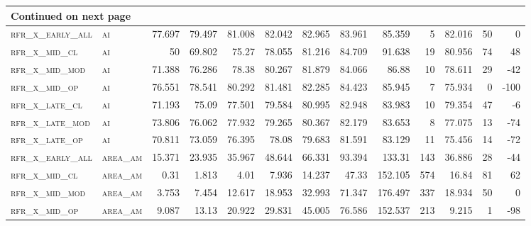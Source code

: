 \begin{landscape}
\begin{center}
\begin{footnotesize}
\begin{longtable}{llrrrrrrrr|rrr}
\hline \multicolumn{13}{|l|}{{Continued on next page}} \\ \hline
\endfoot

\hline \hline
\endlastfoot

\textsc{rfr\_x\_early\_all} & \textsc{ai        }   & 77.697  & 79.497  & 81.008  & 82.042   & 82.965   & 83.961   & 85.359   & 5      & 82.016        & 50            & 0               \\
\textsc{rfr\_x\_mid\_cl   } & \textsc{ai        }   & 50      & 69.802  & 75.27   & 78.055   & 81.216   & 84.709   & 91.638   & 19     & 80.956        & 74            & 48              \\
\textsc{rfr\_x\_mid\_mod  } & \textsc{ai        }   & 71.388  & 76.286  & 78.38   & 80.267   & 81.879   & 84.066   & 86.88    & 10     & 78.611        & 29            & -42             \\
\textsc{rfr\_x\_mid\_op   } & \textsc{ai        }   & 76.551  & 78.541  & 80.292  & 81.481   & 82.285   & 84.423   & 85.945   & 7      & 75.934        & 0             & -100            \\
\textsc{rfr\_x\_late\_cl  } & \textsc{ai        }   & 71.193  & 75.09   & 77.501  & 79.584   & 80.995   & 82.948   & 83.983   & 10     & 79.354        & 47            & -6              \\
\textsc{rfr\_x\_late\_mod } & \textsc{ai        }   & 73.806  & 76.062  & 77.932  & 79.265   & 80.367   & 82.179   & 83.653   & 8      & 77.075        & 13            & -74             \\
\textsc{rfr\_x\_late\_op  } & \textsc{ai        }   & 70.811  & 73.059  & 76.395  & 78.08    & 79.683   & 81.591   & 83.129   & 11     & 75.456        & 14            & -72             \\
\textsc{rfr\_x\_early\_all} & \textsc{area\_am  }   & 15.371  & 23.935  & 35.967  & 48.644   & 66.331   & 93.394   & 133.31   & 143    & 36.886        & 28            & -44             \\
\textsc{rfr\_x\_mid\_cl   } & \textsc{area\_am  }   & 0.31    & 1.813   & 4.01    & 7.936    & 14.237   & 47.33    & 152.105  & 574    & 16.84         & 81            & 62              \\
\textsc{rfr\_x\_mid\_mod  } & \textsc{area\_am  }   & 3.753   & 7.454   & 12.617  & 18.953   & 32.993   & 71.347   & 176.497  & 337    & 18.934        & 50            & 0               \\
\textsc{rfr\_x\_mid\_op   } & \textsc{area\_am  }   & 9.087   & 13.13   & 20.922  & 29.831   & 45.005   & 76.586   & 152.537  & 213    & 9.215         & 1             & -98             \\

\end{longtable}
\end{footnotesize}
\end{center}
\end{landscape}
